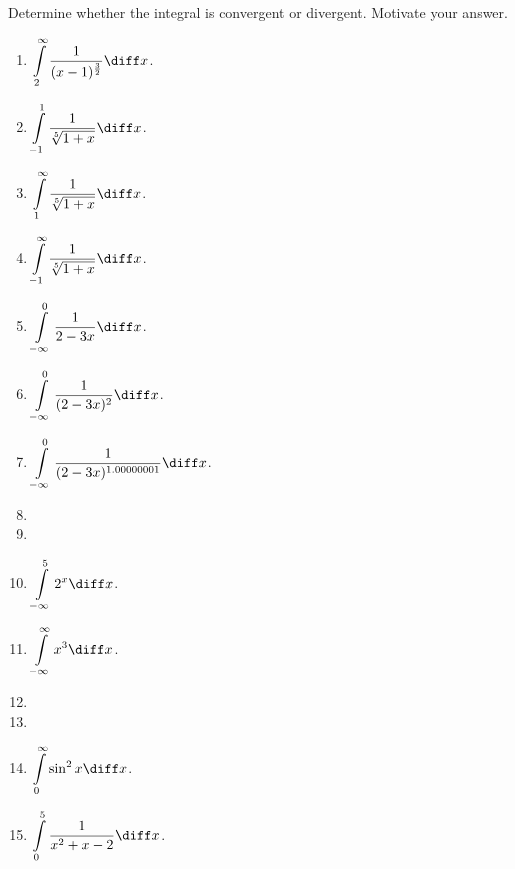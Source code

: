 Determine whether the integral is convergent or divergent. Motivate your answer.
\begin{multicols}{2}
\begin{enumerate}[ref={\fcProblemRef}]
\item $\displaystyle \int\limits_{2}^{\infty}\frac{1}{(x-1)^{\frac32}} \diff x$.

\item $\displaystyle \int\limits_{-1}^{1}\frac{1}{\sqrt[5]{1+x}} \diff x$.

\item $\displaystyle \int\limits_{1}^{\infty }\frac{1}{\sqrt[5]{1+x}} \diff x$.

\item $\displaystyle \int\limits_{-1}^{\infty }\frac{1}{\sqrt[5]{1+x}} \diff x$.

\item $\displaystyle \int\limits_{-\infty }^{0}\frac{1}{2-3x} \diff x$.

\item $\displaystyle \int\limits_{-\infty }^{0}\frac{1}{(2-3x)^{2}} \diff x$.

\item $\displaystyle \int\limits_{-\infty }^{0}\frac{1}{(2-3x)^{1.00000001}} \diff x$.

\item 
\item 
\item $\displaystyle \int\limits_{-\infty }^{5}  2^x \diff x$.

\item $\displaystyle \int\limits_{-\infty }^{\infty}x^3 \diff x$.

\item  
\item 
\item $\displaystyle \int\limits_{0}^{\infty}\sin^2 x \diff x$.

\item $\displaystyle \int\limits_{0}^{5}\frac{1}{x^2+x-2} \diff x$.


\end{enumerate}
\end{multicols}
